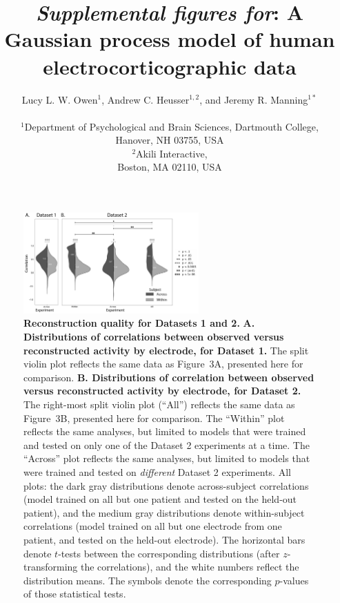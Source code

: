 \documentclass[10pt]{article}
\title{\textit{Supplemental figures for}: A Gaussian process model of human electrocorticographic data}
\author{
  Lucy L. W. Owen$^{1}$,
  Andrew C. Heusser$^{1, 2}$, and
  Jeremy R. Manning$^{1\ast}$\\\\
$^{1}$Department of Psychological and Brain Sciences, Dartmouth College,\\
Hanover, NH 03755, USA\\
$^{2}$Akili Interactive,\\
Boston, MA 02110, USA}
\begin{document}
\maketitle

\setcounter{equation}{0}
\setcounter{figure}{0}
\setcounter{table}{0}
\setcounter{page}{1}
\setcounter{section}{0}
\makeatletter
\renewcommand{\theequation}{S\arabic{equation}}
\renewcommand{\thefigure}{S\arabic{figure}}
\renewcommand{\bibnumfmt}[1]{[S#1]}
\renewcommand{\citenumfont}[1]{S#1}


\begin{figure}[b!]
\centering
\includegraphics[width=0.6\textwidth]{figs/supplemental_1}
\caption{\textbf{Reconstruction quality for Datasets 1 and 2.}
  \textbf{A. Distributions of correlations between observed versus
    reconstructed activity by electrode, for Dataset 1.} The split
  violin plot reflects the same data as Figure~3A, presented here for
  comparison.  \textbf{B. Distributions of correlation between
    observed versus reconstructed activity by electrode, for Dataset
    2.}  The right-most split violin plot (``All'') reflects the same
  data as Figure~3B, presented here for comparison.  The ``Within''
  plot reflects the same analyses, but limited to models that were
  trained and tested on only one of the Dataset 2 experiments at a
  time.  The ``Across'' plot reflects the same analyses, but limited
  to models that were trained and tested on \textit{different} Dataset
  2 experiments.  All plots: the dark gray distributions denote
  across-subject correlations (model trained on all but one patient
  and tested on the held-out patient), and the medium gray
  distributions denote within-subject correlations (model trained on
  all but one electrode from one patient, and tested on the held-out
  electrode).  The horizontal bars denote $t$-tests between the
  corresponding distributions (after $z$-transforming the
  correlations), and the white numbers reflect the distribution means.
  The symbols denote the corresponding $p$-values of those statistical
  tests.}
\label{fig:supplemental_1}
\end{figure}
\end{document}
